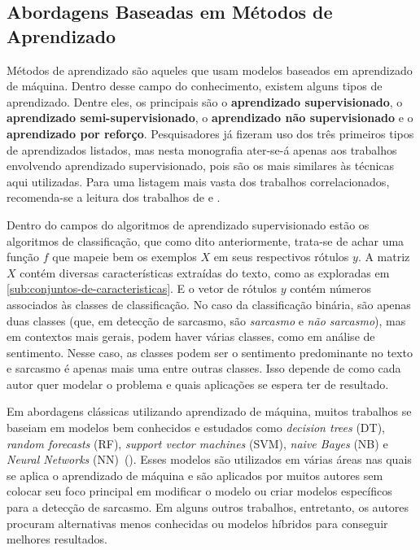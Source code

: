\subsection{Abordagens Baseadas em Métodos de Aprendizado}%
\label{sub:abordagens_baseadas_em_metodos_de_aprendizado}

Métodos de aprendizado são aqueles que usam modelos baseados em aprendizado de
máquina. Dentro desse campo do conhecimento, existem alguns tipos de
aprendizado. Dentre eles, os principais são o \textbf{aprendizado
supervisionado}, o \textbf{aprendizado semi-supervisionado}, o
\textbf{aprendizado não supervisionado} e o \textbf{aprendizado por reforço}.
Pesquisadores já fizeram uso dos três primeiros tipos de aprendizados listados,
mas nesta monografia ater-se-á apenas aos trabalhos envolvendo aprendizado
supervisionado, pois são os mais similares às técnicas aqui utilizadas. Para uma
listagem mais vasta dos trabalhos correlacionados, recomenda-se a leitura dos
trabalhos de \cite{joshi:2017:sarcasm-detection-survey} e
\cite{yaghoobian:2021:sarcasm-detection-comparative-study}.

Dentro do campos do algoritmos de aprendizado supervisionado estão os algoritmos
de classificação, que como dito anteriormente, trata-se de achar uma função $f$
que mapeie bem os exemplos $X$ em seus respectivos rótulos $y$. A matriz $X$
contém diversas características extraídas do texto, como as exploradas em
\ref{sub:conjuntos-de-caracteristicas}. E o vetor de rótulos $y$ contém números
associados às classes de classificação. No caso da classificação binária, são
apenas duas classes (que, em detecção de sarcasmo, são \textit{sarcasmo} e
\textit{não sarcasmo}), mas em contextos mais gerais, podem haver várias
classes, como em análise de sentimento. Nesse caso, as classes podem ser o
sentimento predominante no texto e sarcasmo é apenas mais uma entre outras
classes. Isso depende de como cada autor quer modelar o problema e quais
aplicações se espera ter de resultado.

Em abordagens clássicas utilizando aprendizado de máquina, muitos trabalhos se
baseiam em modelos bem conhecidos e estudados como \textit{decision trees} (DT),
\textit{random forecasts} (RF), \textit{support vector machines} (SVM),
\textit{naive Bayes} (NB) e \textit{Neural Networks}
(NN)~(\cite{yaghoobian:2021:sarcasm-detection-comparative-study}). Esses modelos
são utilizados em várias áreas nas quais se aplica o aprendizado de máquina e
são aplicados por muitos autores sem colocar seu foco principal em modificar o
modelo ou criar modelos específicos para a detecção de sarcasmo. Em alguns
outros trabalhos, entretanto, os autores procuram alternativas menos conhecidas
ou modelos híbridos para conseguir melhores resultados.

